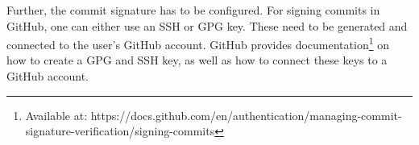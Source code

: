 Further, the commit signature has to be configured. For signing commits in GitHub, one can either use an SSH or GPG key. These need to be generated and connected to the user's GitHub account.
GitHub provides documentation\footnote{Available at: https://docs.github.com/en/authentication/managing-commit-signature-verification/signing-commits} on how to create a GPG and SSH key, as well as how to connect these keys to a GitHub account.

